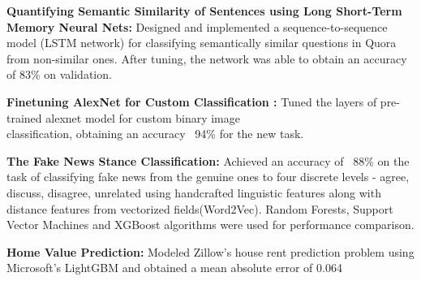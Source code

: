 %
\begin{cventries}
\vspace{-5mm}
  \cventry
    {}
    {}
    {}
    {}
    {
      \begin{cvitems}
      \item {{ \textbf{Quantifying Semantic Similarity of Sentences using Long Short-Term Memory Neural Nets:} Designed and implemented a sequence-to-sequence model (LSTM network) for classifying semantically similar questions in Quora from non-similar ones. After tuning, the network was able to obtain an accuracy of 83\% on validation.}}
      \item {{\textbf{Finetuning AlexNet for Custom Classification : } Tuned the layers of pre-trained alexnet model for custom binary image \\ classification, obtaining an accuracy ~94\% for the new task.}}
      \item { \textbf{The Fake News Stance Classification:} Achieved an accuracy of ~88\% on the task of classifying fake news from the genuine ones to four discrete levels - agree, discuss, disagree, unrelated using handcrafted linguistic features along with distance features from vectorized fields(Word2Vec). Random Forests, Support Vector Machines and XGBoost algorithms were used for performance comparison.}
      \item { \textbf{Home Value Prediction:} Modeled Zillow's house rent prediction problem using Microsoft's LightGBM and obtained a mean absolute error of 0.064}
      \end{cvitems}
    }
\end{cventries}
